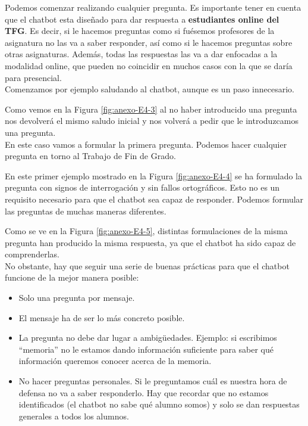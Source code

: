 
Podemos comenzar realizando cualquier pregunta. Es importante tener en cuenta que el chatbot esta diseñado para dar respuesta a \textbf{estudiantes online del TFG}. Es decir, si le hacemos preguntas como si fuésemos profesores de la asignatura no las va a saber responder, así como si le hacemos preguntas sobre otras asignaturas. Además, todas las respuestas las va a dar enfocadas a la modalidad online, que pueden no coincidir en muchos casos con la que se daría para presencial.\\
Comenzamos por ejemplo saludando al chatbot, aunque es un paso innecesario.


Como vemos en la Figura \ref{fig:anexo-E4-3} al no haber introducido una pregunta nos devolverá el mismo saludo inicial y nos volverá a pedir que le introduzcamos una pregunta.\\
En este caso vamos a formular la primera pregunta. Podemos hacer cualquier pregunta en torno al Trabajo de Fin de Grado. 


En este primer ejemplo mostrado en la Figura \ref{fig:anexo-E4-4} se ha formulado la pregunta con signos de interrogación y sin fallos ortográficos. Esto no es un requisito necesario para que el chatbot sea capaz de responder. Podemos formular las preguntas de muchas maneras diferentes.



Como se ve en la Figura \ref{fig:anexo-E4-5}, distintas formulaciones de la misma pregunta han producido la misma respuesta, ya que el chatbot ha sido capaz de comprenderlas. \\
No obstante, hay que seguir una serie de buenas prácticas para que el chatbot funcione de la mejor manera posible:
\begin{itemize}
	\tightlist
	\item
	Solo una pregunta por mensaje.
	\item
	El mensaje ha de ser lo más concreto posible.
	\item
	La pregunta no debe dar lugar a ambigüedades. Ejemplo: si escribimos ``memoria'' no le estamos dando información suficiente para saber qué información queremos conocer acerca de la memoria.
	\item
	No hacer preguntas personales. Si le preguntamos cuál es nuestra hora de defensa no va a saber responderlo. Hay que recordar que no estamos identificados (el chatbot no sabe qué alumno somos) y solo se dan respuestas generales a todos los alumnos.
\end{itemize}


